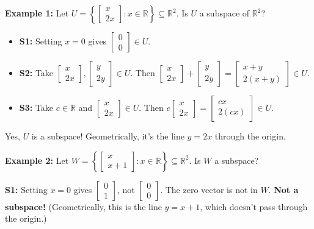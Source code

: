 \documentclass[11pt]{article}
\theoremstyle{definition}
\theoremstyle{plain}
\theoremstyle{remark}
\begin{document}
\begin{workedexample}[title=\textbf{Worked Example: Is this a subspace?}]
\textbf{Example 1:} Let $U = \left\{ \begin{bmatrix} x \\ 2x \end{bmatrix} : x \in \mathbb{R} \right\} \subseteq \mathbb{R}^2$. Is $U$ a subspace of $\mathbb{R}^2$?

\begin{itemize}[nosep]
  \item \textbf{S1:} Setting $x = 0$ gives $\begin{bmatrix}0\\0\end{bmatrix} \in U$. \checkmark
  \item \textbf{S2:} Take $\begin{bmatrix}x\\2x\end{bmatrix}, \begin{bmatrix}y\\2y\end{bmatrix} \in U$. Then $\begin{bmatrix}x\\2x\end{bmatrix} + \begin{bmatrix}y\\2y\end{bmatrix} = \begin{bmatrix}x+y\\2(x+y)\end{bmatrix} \in U$. \checkmark
  \item \textbf{S3:} Take $c \in \mathbb{R}$ and $\begin{bmatrix}x\\2x\end{bmatrix} \in U$. Then $c\begin{bmatrix}x\\2x\end{bmatrix} = \begin{bmatrix}cx\\2(cx)\end{bmatrix} \in U$. \checkmark
\end{itemize}
Yes, $U$ is a subspace! Geometrically, it's the line $y = 2x$ through the origin.

\medskip
\textbf{Example 2:} Let $W = \left\{ \begin{bmatrix} x \\ x + 1 \end{bmatrix} : x \in \mathbb{R} \right\} \subseteq \mathbb{R}^2$. Is $W$ a subspace?

\textbf{S1:} Setting $x = 0$ gives $\begin{bmatrix}0\\1\end{bmatrix}$, not $\begin{bmatrix}0\\0\end{bmatrix}$. The zero vector is not in $W$. \textbf{Not a subspace!} (Geometrically, this is the line $y = x + 1$, which doesn't pass through the origin.)
\end{workedexample}
\end{document}

